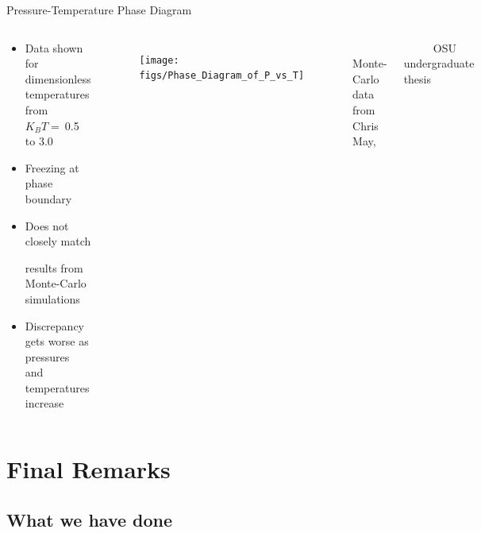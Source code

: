 \documentclass{beamer}
\begin{document}
\begin{frame}{Pressure-Temperature Phase Diagram}
\begin{columns}
	    \vspace{-2.2em}
        \begin{block}{}
            \begin{itemize}
            \item Data shown for dimensionless temperatures from $K_BT=~$0.5 to 3.0
            \item Freezing at phase boundary
            \item Does not closely match 
            
            results from Monte-Carlo simulations 
            \item Discrepancy gets worse as pressures and temperatures increase
            \end{itemize}
            \end{block}
         \begin{figure}       
           \centering
            \texttt{[image: figs/Phase\_Diagram\_of\_P\_vs\_T]}\\
          \end{figure}  
        \vspace{-1em}
        \footnotesize $~~~~~~~~~~~~$Monte-Carlo data from Chris May, 
    
         $~~~~~~~~~~~~$OSU undergraduate thesis
        \normalsize
     \end{columns}
\end{frame}

\section*{Final Remarks}
\subsection*{What we have done}
\end{document}
